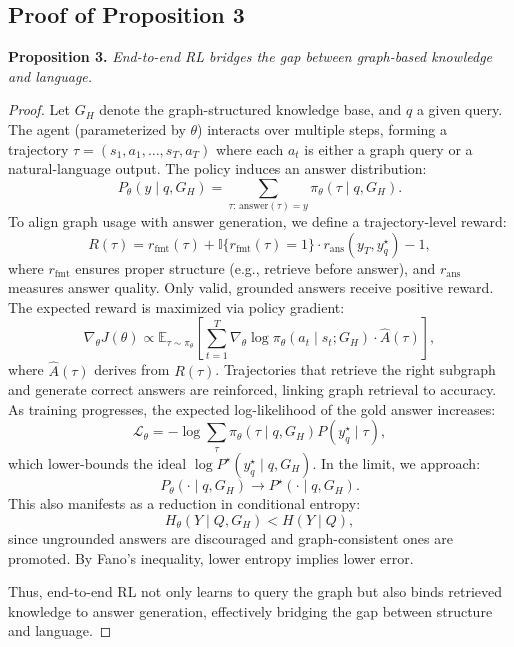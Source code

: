 \documentclass{article}
\theoremstyle{plain}
\theoremstyle{definition}
\theoremstyle{remark}
\begin{document}
\subsection{Proof of Proposition 3}
\label{proof3}
\textbf{Proposition 3.}
\textit{End-to-end RL bridges the gap between graph-based knowledge and language.}\vspace{-2mm}
\begin{proof}
Let $G_H$ denote the graph-structured knowledge base, and $q$ a given query. The agent (parameterized by $\theta$) interacts over multiple steps, forming a trajectory $\tau = (s_1, a_1, \dots, s_T, a_T)$ where each $a_t$ is either a graph query or a natural-language output. The policy induces an answer distribution:
\begin{equation}
P_\theta(y \mid q, G_H) = \sum_{\tau:\,\text{answer}(\tau)=y} \pi_\theta(\tau \mid q, G_H).
\end{equation}
To align graph usage with answer generation, we define a trajectory-level reward:
\begin{equation}
R(\tau) = r_{\text{fmt}}(\tau) + \mathbb{I}\{r_{\text{fmt}}(\tau)=1\} \cdot r_{\text{ans}}(y_T, y_q^\star) - 1,
\end{equation}
where $r_{\text{fmt}}$ ensures proper structure (e.g., retrieve before answer), and $r_{\text{ans}}$ measures answer quality. Only valid, grounded answers receive positive reward.
The expected reward is maximized via policy gradient:
\begin{equation}
\nabla_\theta J(\theta) \propto \mathbb{E}_{\tau \sim \pi_\theta} \left[ \sum_{t=1}^T \nabla_\theta \log \pi_\theta(a_t \mid s_t; G_H) \cdot \hat{A}(\tau) \right],
\end{equation}
where $\hat{A}(\tau)$ derives from $R(\tau)$. Trajectories that retrieve the right subgraph and generate correct answers are reinforced, linking graph retrieval to accuracy.
As training progresses, the expected log-likelihood of the gold answer increases:
\begin{equation}
\mathcal{L}_\theta = - \log \sum_\tau \pi_\theta(\tau \mid q, G_H) P(y_q^\star \mid \tau),
\end{equation}
which lower-bounds the ideal $\log P^\star(y_q^\star \mid q, G_H)$. In the limit, we approach:
\begin{equation}
P_\theta(\cdot \mid q, G_H) \to P^\star(\cdot \mid q, G_H).
\end{equation}
This also manifests as a reduction in conditional entropy:
\begin{equation}
H_\theta(Y \mid Q, G_H) < H(Y \mid Q),
\end{equation}
since ungrounded answers are discouraged and graph-consistent ones are promoted. By Fano’s inequality, lower entropy implies lower error.

Thus, end-to-end RL not only learns to query the graph but also binds retrieved knowledge to answer generation, effectively bridging the gap between structure and language.
\end{proof}
\end{document}
